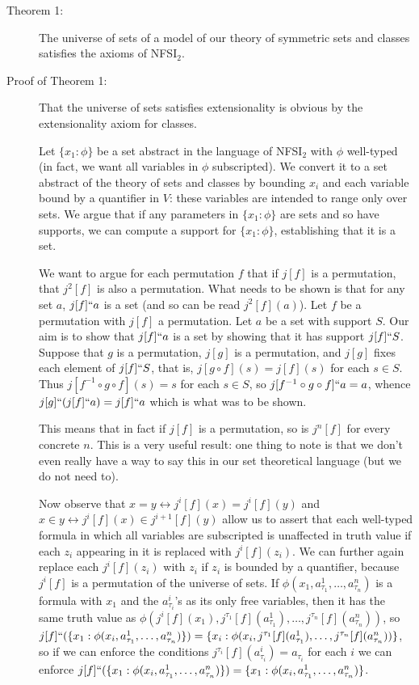 \documentclass{article}
\begin{document}
\begin{description}
\begin{description}

\item[Theorem 1:]  The universe of sets of a model of our theory of symmetric sets and classes satisfies the axioms of NFSI$_2$.  


\item[Proof of Theorem 1:]
That the universe of sets
satisfies extensionality is obvious by the extensionality axiom for classes.

Let $\{x_1 :\phi\}$ be a set abstract in the language of NFSI$_2$ with $\phi$ well-typed (in fact, we want all variables in $\phi$ subscripted).  We convert it to a set abstract of the theory of sets and classes
by bounding $x_i$ and each variable bound by a quantifier in $V$:  these variables are intended to range only over sets.  We argue that if any
parameters in $\{x_1:\phi\}$ are sets and so have supports, we can compute a support for $\{x_1:\phi\}$, establishing that it is a set.

We want to argue for each permutation $f$ that if $j[f]$ is a permutation, that $j^2[f]$ is also a permutation.  What needs to be shown is that
for any set $a$, $j[f]``a$ is a set (and so can be read $j^2[f](a)$).  Let $f$ be a permutation with $j[f]$ a permutation.  Let $a$ be a set with support $S$.
Our aim is to show that $j[f]``a$ is a set by showing that it has support $j[f]``S$.  Suppose that $g$ is a permutation, $j[g]$ is a permutation,
and $j[g]$ fixes each element of $j[f]``S$, that is, $j[g \circ f](s) = j[f](s)$ for each $s \in S$.  Thus $j[f^{-1} \circ g \circ f](s) = s$ for
each $s \in S$, so $j[f^{-1} \circ g \circ f]``a = a$, whence $j[g] ``(j[f]``a) = j[f]``a$ which is what was to be shown.

This means that in fact if $j[f]$ is a permutation, so is $j^n[f]$ for every concrete $n$.  This is a very useful result:  one thing to note is that we don't
even really have a way to say this in our set theoretical language (but we do not need to).

Now observe that $x = y \leftrightarrow j^i[f](x) = j^i[f](y)$ and $x \in y \leftrightarrow j^i[f](x) \in j^{i+1}[f](y)$ allow us to assert that
each well-typed formula in which all variables are subscripted is unaffected in truth value if each $z_i$ appearing in it is replaced with
$j^i[f](z_i)$.  We can further again replace each $j^i[f](z_i)$ with $z_i$ if $z_i$ is bounded by a quantifier, because $j^i[f]$ is a permutation of the universe of sets.   If $\phi(x_1,a^1_{\tau_1},\ldots,a^n_{\tau_n})$ is a formula with $x_1$ and the $a^i_{\tau_i}$'s as its only free variables,  then it
has the same truth value as $\phi(j^i[f](x_1),j^{\tau_1}[f](a^1_{\tau_1}),\ldots,j^{\tau_n}[f](a^n_{\tau_n}))$, so
$j[f]``(\{x_1:\phi(x_i,a^1_{\tau_1},\ldots,a^n_{\tau_n})\}) = \{x_i:\phi(x_i,j^{\tau_1}[f](a^1_{\tau_1}),\ldots,j^{\tau_n}[f](a^n_{\tau_n}))\}$, so
if we can enforce the conditions $j^{\tau_i}[f](a^i_{\tau_i})=a_{\tau_i}$ for each $i$ we can enforce $j[f]``(\{x_1:\phi(x_i,a^1_{\tau_1},\ldots,a^n_{\tau_n})\}) = \{x_1:\phi(x_i,a^1_{\tau_1},\ldots,a^n_{\tau_n})\}$.


\end{description}
\end{description}
\end{document}
